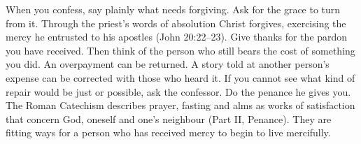 When you confess, say plainly what needs forgiving. Ask for the grace to
turn from it. Through the priest's words of absolution Christ forgives,
exercising the mercy he entrusted to his apostles (John 20:22--23). Give thanks for the pardon you have received. Then think of the
person who still bears the cost of something you did. An overpayment can be returned. A story told at another
person's expense can be corrected with those who heard it. If you cannot
see what kind of repair would be just or possible, ask the confessor.
Do the penance he gives you. The Roman Catechism describes prayer,
fasting and alms as works of satisfaction that concern God, oneself
and one's neighbour (Part II, Penance). They are fitting ways for a
person who has received mercy to begin to live mercifully.
